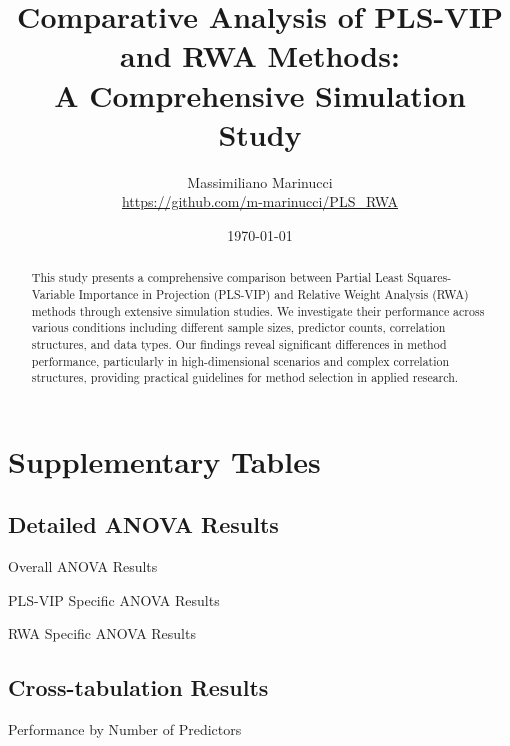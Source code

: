 \documentclass[12pt,a4paper]{article}
\title{Comparative Analysis of PLS-VIP and RWA Methods: \\
A Comprehensive Simulation Study}
\author{Massimiliano Marinucci\\
\href{https://github.com/m-marinucci/PLS_RWA}{https://github.com/m-marinucci/PLS\_RWA}}
\date{\today}
\begin{document}
\maketitle

\begin{abstract}
This study presents a comprehensive comparison between Partial Least Squares-Variable Importance in Projection (PLS-VIP) and Relative Weight Analysis (RWA) methods through extensive simulation studies. We investigate their performance across various conditions including different sample sizes, predictor counts, correlation structures, and data types. Our findings reveal significant differences in method performance, particularly in high-dimensional scenarios and complex correlation structures, providing practical guidelines for method selection in applied research.
\end{abstract}







\appendix
\section{Supplementary Tables}
\label{sec:appendix}

\subsection{Detailed ANOVA Results}
\begin{table}[H]
\centering
\caption{Overall ANOVA Results}
\label{tab:overall_anova}

\end{table}

\begin{table}[H]
\centering
\caption{PLS-VIP Specific ANOVA Results}
\label{tab:plsvip_anova}

\end{table}

\begin{table}[H]
\centering
\caption{RWA Specific ANOVA Results}
\label{tab:rwa_anova}

\end{table}

\subsection{Cross-tabulation Results}
\begin{table}[H]
\centering
\caption{Performance by Number of Predictors}
\label{tab:crosstab_j}

\end{table}
\end{document}
